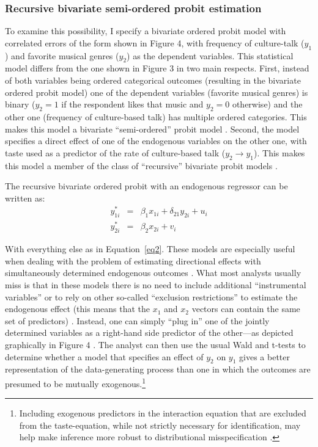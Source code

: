 \documentclass[11pt]{article}
\begin{document}
\subsubsection{Recursive bivariate semi-ordered probit estimation}
To examine this possibility, I specify a bivariate ordered probit model with correlated errors of the form shown in Figure 4, with frequency of culture-talk ($y_{1}$) and favorite musical genres ($y_{2}$) as the dependent variables.  This statistical model differs from the one shown in Figure 3 in two main respects. First, instead of both variables being ordered categorical outcomes (resulting in the bivariate ordered probit model) one of the dependent variables (favorite musical genres) is binary ($y_{2}=1$ if the respondent likes that music and $y_{2}=0$ otherwise) and the other one (frequency of culture-based talk) has multiple ordered categories. This makes this model a bivariate ``semi-ordered'' probit model \citep{armstrong_mcvicar02}.  Second, the model specifies a direct effect of one of the endogenous variables on the other one, with taste used as a predictor of the rate of culture-based talk ($y_{2} \rightarrow y_{1}$).  This makes this model a member of the class of ``recursive'' bivariate probit models \citep{monfardini_radice08}.  

The recursive bivariate ordered probit with an endogenous regressor can be written as:
\begin{eqnarray*}
		y^{*}_{1i} & = &\beta_{1} x_{1i}+\delta_{21}y_{2i}+u_{i} \\ 
		y^{*}_{2i} & = &\beta_{2} x_{2i}+v_{i}
	\label{eq4}
\end{eqnarray*}

With everything else as in Equation~\ref{eq2}.  These models are especially useful when dealing with the problem of estimating directional effects with simultaneously determined endogenous outcomes \citep{greene98}.  What most analysts usually miss is that in these models there is no need to include additional ``instrumental variables'' or to rely on other so-called ``exclusion restrictions'' to estimate the endogenous effect (this means that the $x_{1}$ and $x_{2}$ vectors can contain the same set of predictors) \citep{monfardini_radice08}.  Instead, one can simply ``plug in'' one of the jointly determined variables as a right-hand side predictor of the other---as depicted graphically in Figure 4 \citep{greene98}. The analyst can then use the usual Wald and t-tests to determine whether a model that specifies an effect of $y_{2}$ on $y_{1}$ gives a better representation of the data-generating process than one in which the outcomes are presumed to be mutually exogenous.\footnote{Including exogenous predictors in the interaction equation that are excluded from the taste-equation, while not strictly necessary for identification, may help make inference more robust to distributional misspecification \citep{monfardini_radice08}.}
\end{document}
